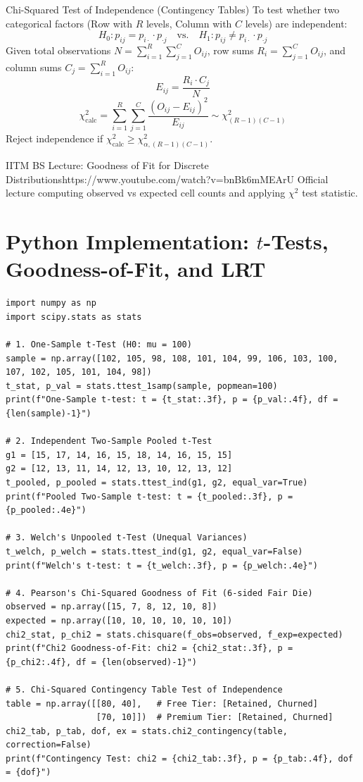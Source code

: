 \begin{formulabox}{Chi-Squared Test of Independence (Contingency Tables)}
To test whether two categorical factors (Row with $R$ levels, Column with $C$ levels) are independent:
$$H_0 \colon p_{ij} = p_{i\cdot} \cdot p_{\cdot j} \quad \text{vs.} \quad H_1 \colon p_{ij} \neq p_{i\cdot} \cdot p_{\cdot j}$$
Given total observations $N = \sum_{i=1}^R \sum_{j=1}^C O_{ij}$, row sums $R_i = \sum_{j=1}^C O_{ij}$, and column sums $C_j = \sum_{i=1}^R O_{ij}$:
$$E_{ij} = \frac{R_i \cdot C_j}{N}$$
$$\chi_{\text{calc}}^2 = \sum_{i=1}^R \sum_{j=1}^C \frac{(O_{ij} - E_{ij})^2}{E_{ij}} \sim \chi_{(R - 1)(C - 1)}^2$$
Reject independence if $\chi_{\text{calc}}^2 \ge \chi_{\alpha, (R-1)(C-1)}^2$.
\end{formulabox}

\begin{videocard}{IITM BS Lecture: Goodness of Fit for Discrete Distributions}{https://www.youtube.com/watch?v=bnBk6mMEArU}
Official lecture computing observed vs expected cell counts and applying $\chi^2$ test statistic.
\end{videocard}

\section{Python Implementation: $t$-Tests, Goodness-of-Fit, and LRT}

\begin{lstlisting}[caption={SciPy and Statsmodels Implementation of Advanced Testing}]
import numpy as np
import scipy.stats as stats

# 1. One-Sample t-Test (H0: mu = 100)
sample = np.array([102, 105, 98, 108, 101, 104, 99, 106, 103, 100, 107, 102, 105, 101, 104, 98])
t_stat, p_val = stats.ttest_1samp(sample, popmean=100)
print(f"One-Sample t-test: t = {t_stat:.3f}, p = {p_val:.4f}, df = {len(sample)-1}")

# 2. Independent Two-Sample Pooled t-Test
g1 = [15, 17, 14, 16, 15, 18, 14, 16, 15, 15]
g2 = [12, 13, 11, 14, 12, 13, 10, 12, 13, 12]
t_pooled, p_pooled = stats.ttest_ind(g1, g2, equal_var=True)
print(f"Pooled Two-Sample t-test: t = {t_pooled:.3f}, p = {p_pooled:.4e}")

# 3. Welch's Unpooled t-Test (Unequal Variances)
t_welch, p_welch = stats.ttest_ind(g1, g2, equal_var=False)
print(f"Welch's t-test: t = {t_welch:.3f}, p = {p_welch:.4e}")

# 4. Pearson's Chi-Squared Goodness of Fit (6-sided Fair Die)
observed = np.array([15, 7, 8, 12, 10, 8])
expected = np.array([10, 10, 10, 10, 10, 10])
chi2_stat, p_chi2 = stats.chisquare(f_obs=observed, f_exp=expected)
print(f"Chi2 Goodness-of-Fit: chi2 = {chi2_stat:.3f}, p = {p_chi2:.4f}, df = {len(observed)-1}")

# 5. Chi-Squared Contingency Table Test of Independence
table = np.array([[80, 40],   # Free Tier: [Retained, Churned]
                  [70, 10]])  # Premium Tier: [Retained, Churned]
chi2_tab, p_tab, dof, ex = stats.chi2_contingency(table, correction=False)
print(f"Contingency Test: chi2 = {chi2_tab:.3f}, p = {p_tab:.4f}, dof = {dof}")
\end{lstlisting}

